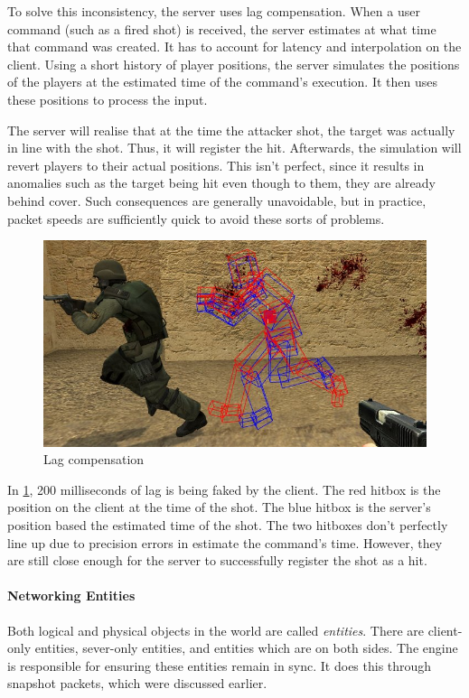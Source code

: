 \documentclass[a4paper, 12pt]{scrartcl}
\begin{document}
To solve this inconsistency, the server uses lag compensation. When a user command (such as a fired shot) is received, the server estimates at what time that command was created. It has to account for latency and interpolation on the client. Using a short history of player positions, the server simulates the positions of the players at the estimated time of the command's execution. It then uses these positions to process the input.

The server will realise that at the time the attacker shot, the target was actually in line with the shot. Thus, it will register the hit. Afterwards, the simulation will revert players to their actual positions. This isn't perfect, since it results in anomalies such as the target being hit even though to them, they are already behind cover. Such consequences are generally unavoidable, but in practice, packet speeds are sufficiently quick to avoid these sorts of problems.

\begin{figure}[!htb]
  \centering
  \includegraphics[width=0.66\linewidth]{images/source_net_lag_comp.jpg}
  \caption{Lag compensation}
  \label{fig:source_net_lag_comp}
\end{figure}

In \cref{fig:source_net_lag_comp}, 200 milliseconds of lag is being faked by the client. The red hitbox is the position on the client at the time of the shot. The blue hitbox is the server's position based the estimated time of the shot. The two hitboxes don't perfectly line up due to precision errors in estimate the command's time. However, they are still close enough for the server to successfully register the shot as a hit.

\paragraph{Networking Entities}
Both logical and physical objects in the world are called \textit{entities}. There are client-only entities, sever-only entities, and entities which are on both sides. The engine is responsible for ensuring these entities remain in sync. It does this through snapshot packets, which were discussed earlier.
\end{document}
